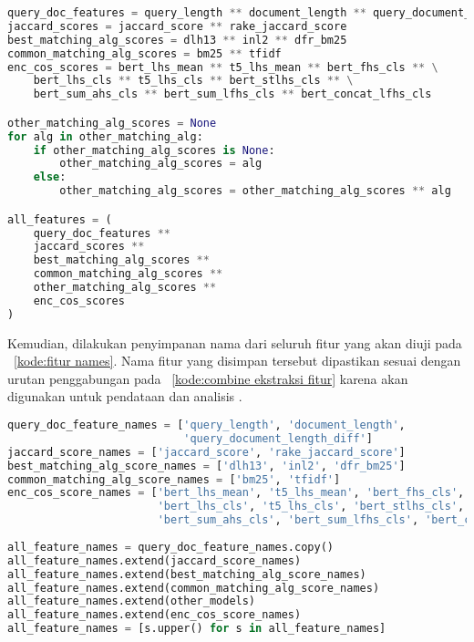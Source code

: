 \begin{lstlisting}[language=Python, caption={Penggabungan \pipeline{} ekstraksi fitur}, label={kode:combine ekstraksi fitur}]
query_doc_features = query_length ** document_length ** query_document_length_diff
jaccard_scores = jaccard_score ** rake_jaccard_score
best_matching_alg_scores = dlh13 ** inl2 ** dfr_bm25
common_matching_alg_scores = bm25 ** tfidf
enc_cos_scores = bert_lhs_mean ** t5_lhs_mean ** bert_fhs_cls ** \
    bert_lhs_cls ** t5_lhs_cls ** bert_stlhs_cls ** \
    bert_sum_ahs_cls ** bert_sum_lfhs_cls ** bert_concat_lfhs_cls

other_matching_alg_scores = None
for alg in other_matching_alg:
    if other_matching_alg_scores is None:
        other_matching_alg_scores = alg
    else:
        other_matching_alg_scores = other_matching_alg_scores ** alg

all_features = (
    query_doc_features **
    jaccard_scores **
    best_matching_alg_scores **
    common_matching_alg_scores **
    other_matching_alg_scores **
    enc_cos_scores
)
\end{lstlisting}

Kemudian, dilakukan penyimpanan nama dari seluruh fitur yang akan diuji pada \kode{}~\ref{kode:fitur names}. Nama fitur yang disimpan tersebut dipastikan sesuai dengan urutan penggabungan \pipeline{} pada \kode{}~\ref{kode:combine ekstraksi fitur} karena akan digunakan untuk pendataan dan analisis \feature{} \importance{}.
\begin{lstlisting}[language=Python, caption={Daftar nama fitur}, label={kode:fitur names}]
query_doc_feature_names = ['query_length', 'document_length',
                           'query_document_length_diff']
jaccard_score_names = ['jaccard_score', 'rake_jaccard_score']
best_matching_alg_score_names = ['dlh13', 'inl2', 'dfr_bm25']
common_matching_alg_score_names = ['bm25', 'tfidf']
enc_cos_score_names = ['bert_lhs_mean', 't5_lhs_mean', 'bert_fhs_cls',
                       'bert_lhs_cls', 't5_lhs_cls', 'bert_stlhs_cls',
                       'bert_sum_ahs_cls', 'bert_sum_lfhs_cls', 'bert_concat_lfhs_cls']
                       
all_feature_names = query_doc_feature_names.copy()
all_feature_names.extend(jaccard_score_names)
all_feature_names.extend(best_matching_alg_score_names)
all_feature_names.extend(common_matching_alg_score_names)
all_feature_names.extend(other_models)
all_feature_names.extend(enc_cos_score_names)
all_feature_names = [s.upper() for s in all_feature_names]
\end{lstlisting}


